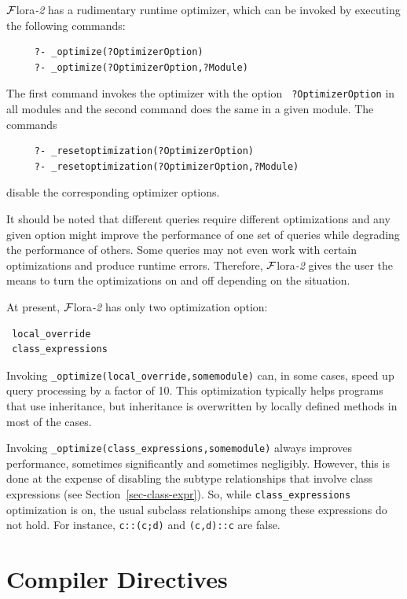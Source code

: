 \documentclass[11pt]{article}
\newcommand{\FLORA}{{\mbox{\sc ${\cal F}${lora}\rm\emph{-2}}}\xspace}
\begin{document}
\FLORA has a rudimentary runtime optimizer, which can be invoked by
executing the following commands:
\begin{verbatim}
     ?- _optimize(?OptimizerOption)  
     ?- _optimize(?OptimizerOption,?Module)  
\end{verbatim}
The first command invokes the optimizer with the option {\tt
  ?OptimizerOption} in all modules and the second command does the same in a
given module. The commands
\begin{verbatim}
     ?- _resetoptimization(?OptimizerOption)  
     ?- _resetoptimization(?OptimizerOption,?Module)    
\end{verbatim}
disable the corresponding optimizer options.

It should be noted that different queries require different optimizations
and any given option might improve the performance of one set of queries
while degrading the performance of others.
Some queries may not even work with certain optimizations and produce
runtime errors.
Therefore, \FLORA gives the user
the means to turn the optimizations on and off depending on the situation.

At present, \FLORA has only two optimization option:
\begin{verbatim}
 local_override  
 class_expressions
\end{verbatim}
Invoking {\tt \_optimize(local\_override,somemodule)} can, in some cases,
speed up query processing by a factor of 10. This optimization typically
helps programs that use inheritance, but inheritance is overwritten by
locally defined methods in most of the cases.

Invoking {\tt \_optimize(class\_expressions,somemodule)} always improves
performance, sometimes significantly and sometimes negligibly.
However, this is done at the expense of disabling the subtype relationships
that involve class expressions (see Section~\ref{sec-class-expr}).
So, while {\tt class\_expressions} optimization is on, the usual
subclass relationships among these expressions do not hold. For instance,
{\tt c::(c;d)} and {\tt (c,d)::c} are false.


\section{Compiler Directives}
\label{sec-comp-directives}

%
\end{document}
